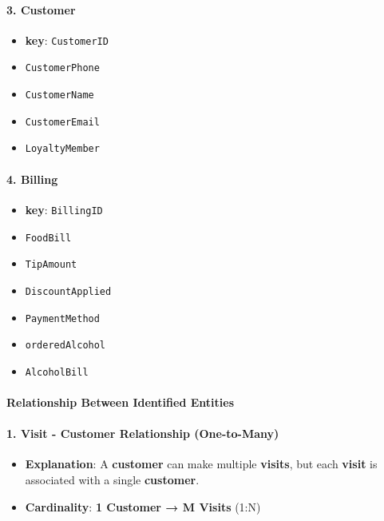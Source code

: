 \documentclass[
]{article}
\providecommand{\tightlist}{%
  \setlength{\itemsep}{0pt}\setlength{\parskip}{0pt}}
\begin{document}
\paragraph{\texorpdfstring{\textbf{3.
Customer}}{3. Customer}}\label{customer}

\begin{itemize}
\tightlist
\item
  \textbf{key}: \texttt{CustomerID}
\item
  \texttt{CustomerPhone}
\item
  \texttt{CustomerName}
\item
  \texttt{CustomerEmail}
\item
  \texttt{LoyaltyMember}
\end{itemize}

\paragraph{\texorpdfstring{\textbf{4.
Billing}}{4. Billing}}\label{billing}

\begin{itemize}
\tightlist
\item
  \textbf{key}: \texttt{BillingID}
\item
  \texttt{FoodBill}
\item
  \texttt{TipAmount}
\item
  \texttt{DiscountApplied}
\item
  \texttt{PaymentMethod}
\item
  \texttt{orderedAlcohol}
\item
  \texttt{AlcoholBill}
\end{itemize}

\paragraph{\texorpdfstring{\textbf{Relationship Between Identified
Entities}}{Relationship Between Identified Entities}}\label{relationship-between-identified-entities}

\paragraph{1. Visit - Customer Relationship
(One-to-Many)}\label{visit---customer-relationship-one-to-many}

\begin{itemize}
\tightlist
\item
  \textbf{Explanation}: A \textbf{customer} can make multiple
  \textbf{visits}, but each \textbf{visit} is associated with a single
  \textbf{customer}.
\item
  \textbf{Cardinality}: \textbf{1 Customer → M Visits} (1:N)
\end{itemize}
\end{document}
